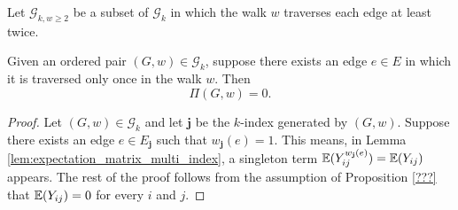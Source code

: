 \begin{definition}
  \label{def:g_k_ge_2}
  Let $\mathcal{G}_{k,w \geq 2}$ be a subset of $\mathcal{G}_k$ in which the walk $w$ traverses each edge at least twice.
\end{definition}
\begin{lemma}[$\Pi (G,w) = 0$ : R-1-15 : lem:Pi.prod\_eq\_zero\_if\_w\_le\_two]
  \label{lem:Pi.prod_eq_zero_if_w_le_two}
  Given an ordered pair $(G,w) \in \mathcal{G}_k$, suppose there exists an edge $e \in E$ in which it is traversed only once in the walk $w$. Then
  \[
  \Pi (G,w) = 0.
  \]
\end{lemma}
\begin{proof}
  Let $(G,w) \in \mathcal{G}_k$ and let $\mathbf{j}$ be the $k$-index generated by $(G,w)$. Suppose there exists an edge $e \in E_\mathbf{j}$ such that $w_\mathbf{j}(e) = 1$.
  This means, in Lemma \ref{lem:expectation_matrix_multi_index}, a singleton term $\mathbb{E} (Y_{ij}^{w_\mathbf{j}(e)}) = \mathbb{E} (Y_{ij})$ appears.
  The rest of the proof follows from the assumption of Proposition \ref{???} that $\mathbb{E} (Y_{ij}) = 0$ for every $i$ and $j$. 
\end{proof}
